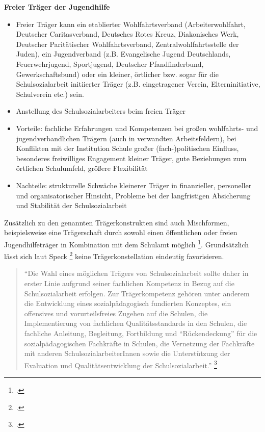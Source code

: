 \textbf{Freier Träger der Jugendhilfe}\\
\begin{itemize}
	\item Freier Träger kann ein etablierter Wohlfahrtsverband (Arbeiterwohlfahrt, Deutscher Caritasverband, Deutsches Rotes Kreuz, Diakonisches Werk, Deutscher Paritätischer Wohlfahrtsverband, Zentralwohlfahrtsstelle der Juden), ein Jugendverband (z.B. Evangelische Jugend Deutschlands, Feuerwehrjugend, Sportjugend, Deutscher Pfandfinderbund, Gewerkschaftsbund) oder ein kleiner, örtlicher bzw. sogar für die Schulsozialarbeit initiierter Träger (z.B. eingetragener Verein, Elterninitiative, Schulverein etc.) sein.
	\item Anstellung des Schulsozialarbeiters beim freien Träger
	\item Vorteile: fachliche Erfahrungen und Kompetenzen bei großen wohlfahrts- und jugendverbandlichen Trägern (auch in verwandten Arbeitsfeldern), bei Konflikten mit der Institution Schule großer (fach-)politischen Einfluss, besonderes freiwilliges Engagement kleiner Träger, gute Beziehungen zum örtlichen Schulumfeld, größere Flexibilität
	\item Nachteile: strukturelle Schwäche kleinerer Träger in finanzieller, personeller und organisatorischer Hinsicht, Probleme bei der langfristigen Absicherung und Stabilität der Schulsozialarbeit 
\end{itemize}

Zusätzlich zu den genannten Trägerkonstrukten sind auch Mischformen, beispielsweise eine Trägerschaft durch sowohl einen öffentlichen oder freien Jugendhilfeträger in Kombination mit dem Schulamt möglich \footcite[vgl.][63]{Spies2011}. Grundsätzlich lässt sich laut Speck \footcite{BIVSD2013} keine Trägerkonstellation eindeutig favorisieren.

\begin{quotation}
\noindent
"`Die Wahl eines möglichen Trägers von Schulsozialarbeit sollte daher in erster Linie aufgrund seiner fachlichen Kompetenz in Bezug auf die Schulsozialarbeit erfolgen. Zur Trägerkompetenz gehören unter anderem die Entwicklung eines sozialpädagogisch fundierten Konzeptes, ein offensives und vorurteilsfreies Zugehen auf die Schulen, die Implementierung von fachlichen Qualitätsstandards in den Schulen, die fachliche Anleitung, Begleitung, Fortbildung und "`Rückendeckung"' für die sozialpädagogischen Fachkräfte in Schulen, die Vernetzung der Fachkräfte mit anderen SchulsozialarbeiterInnen sowie die Unterstützung der Evaluation und Qualitätsentwicklung der Schulsozialarbeit."' \footcite{BIVSD2013}
\end{quotation}

